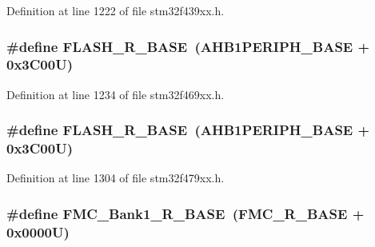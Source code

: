 Definition at line 1222 of file stm32f439xx.\+h.

\subsubsection[{\texorpdfstring{F\+L\+A\+S\+H\+\_\+\+R\+\_\+\+B\+A\+SE}{FLASH_R_BASE}}]{\setlength{\rightskip}{0pt plus 5cm}\#define F\+L\+A\+S\+H\+\_\+\+R\+\_\+\+B\+A\+SE~({\bf A\+H\+B1\+P\+E\+R\+I\+P\+H\+\_\+\+B\+A\+SE} + 0x3\+C00\+U)}\hypertarget{group___peripheral__memory__map_ga8e21f4845015730c5731763169ec0e9b}{}\label{group___peripheral__memory__map_ga8e21f4845015730c5731763169ec0e9b}


Definition at line 1234 of file stm32f469xx.\+h.

\subsubsection[{\texorpdfstring{F\+L\+A\+S\+H\+\_\+\+R\+\_\+\+B\+A\+SE}{FLASH_R_BASE}}]{\setlength{\rightskip}{0pt plus 5cm}\#define F\+L\+A\+S\+H\+\_\+\+R\+\_\+\+B\+A\+SE~({\bf A\+H\+B1\+P\+E\+R\+I\+P\+H\+\_\+\+B\+A\+SE} + 0x3\+C00\+U)}\hypertarget{group___peripheral__memory__map_ga8e21f4845015730c5731763169ec0e9b}{}\label{group___peripheral__memory__map_ga8e21f4845015730c5731763169ec0e9b}


Definition at line 1304 of file stm32f479xx.\+h.

\subsubsection[{\texorpdfstring{F\+M\+C\+\_\+\+Bank1\+\_\+\+R\+\_\+\+B\+A\+SE}{FMC_Bank1_R_BASE}}]{\setlength{\rightskip}{0pt plus 5cm}\#define F\+M\+C\+\_\+\+Bank1\+\_\+\+R\+\_\+\+B\+A\+SE~({\bf F\+M\+C\+\_\+\+R\+\_\+\+B\+A\+SE} + 0x0000\+U)}\hypertarget{group___peripheral__memory__map_ga1d581e6f64ed2e5d97c11c58285a21b6}{}\label{group___peripheral__memory__map_ga1d581e6f64ed2e5d97c11c58285a21b6}


